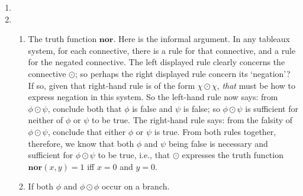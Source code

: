 {{\small
\begin{enumerate}
\item 
\item \begin{enumerate}
	\item The truth function $\mathbf{nor}$. Here is the informal argument. In any tableaux system, for each connective, there is a rule for that connective, and a rule for the negated connective. The left displayed rule clearly concerns the connective $\odot$; so perhaps the right displayed rule concern its `negation'? If so, given that right-hand rule is of the form $\chi\odot\chi$, \emph{that} must be how to express negation in this system. So the left-hand rule now says: from $\phi\odot\psi$, conclude both that $\phi$ is false and $\psi $ is false; so $\phi\odot\psi$ is sufficient for neither of $\phi$ or $\psi$ to be true. The right-hand rule says: from the falsity of $\phi\odot\psi$, conclude that either $\phi$ or $\psi$ is true. From both rules together, therefore, we know that both $\phi$ and $\psi$ being false is necessary and sufficient for $\phi\odot\psi$ to be true, i.e., that $\odot$ expresses the truth function $\mathbf{nor}(x,y) = 1$ iff $x=0$ and $y=0$. 

\item If both $\phi$ and $\phi\odot\phi$ occur on a branch.
\end{enumerate}
\end{enumerate}

}






}
